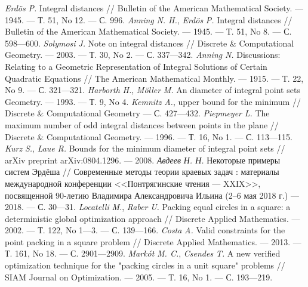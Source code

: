 \begin{thebibliography}{99}
\textsl{Erd\"{o}s} \textsl{P.} Integral distances /\!/ Bulletin of the
American Mathematical Society. --- 1945. --- Т. 51, No 12. --- С. 996.
\textsl{Anning} \textsl{N. H.}, \textsl{Erd\"{o}s} \textsl{P.}
Integral distances /\!/ Bulletin of the American Mathematical
Society. --- 1945. --- Т. 51, No 8. --- С. 598---600.
\textsl{Solymosi} \textsl{J.} Note on integral distances /\!/
Discrete \& Computational Geometry. --- 2003. --- Т. 30, No 2. ---
С. 337---342.
\textsl{Anning} \textsl{N.} Discussions: Relating to a Geometric
Representation of Integral Solutions of Certain Quadratic
Equations /\!/ The American Mathematical Monthly. --- 1915. ---
Т. 22, No 9. --- С. 321---321.
\textsl{Harborth} \textsl{H.},
\textsl{M\"{o}ller} \textsl{M.} An
diameter of integral point sets
Geometry. --- 1993. --- Т. 9, No 4.
\textsl{Kemnitz} \textsl{A.},
upper bound for the minimum
/\!/ Discrete \& Computational Geometry
--- С. 427---432.
\textsl{Piepmeyer} \textsl{L.} The maximum number of odd
integral distances between points in the plane /\!/ Discrete \&
Computational Geometry. --- 1996. --- Т. 16, No 1. --- С. 113---115.
\textsl{Kurz} \textsl{S.}, \textsl{Laue} \textsl{R.} Bounds for
the minimum diameter of integral point sets /\!/ arXiv preprint
arXiv:0804.1296. --- 2008.
\textsl{Авдеев} \textsl{Н. Н.} Некоторые примеры систем
Эрдёша /\!/ Современные методы теории краевых задач :
материалы международной конференции <<Понтрягинские
чтения --- XXIX>>, посвященной 90-летию Владимира
Александровича Ильина (2--6 мая 2018 г.) --- 2018. --- С. 30---31.
\textsl{Locatelli} \textsl{M.}, \textsl{Raber} \textsl{U.} Packing
equal circles in a square: a deterministic global optimization
approach /\!/ Discrete Applied Mathematics. --- 2002. --- Т. 122,
No 1---3. --- С. 139---166.
\textsl{Costa} \textsl{A.} Valid constraints for the point packing
in a square problem /\!/ Discrete Applied Mathematics. --- 2013. ---
Т. 161, No 18. --- С. 2901---2909.
\textsl{Mark\'{o}t} \textsl{M. C.}, \textsl{Csendes} \textsl{T.} A
new verified optimization technique for the "packing circles in
a unit square" problems /\!/ SIAM Journal on Optimization. ---
2005. --- Т. 16, No 1. --- С. 193---219.

\end{thebibliography}
